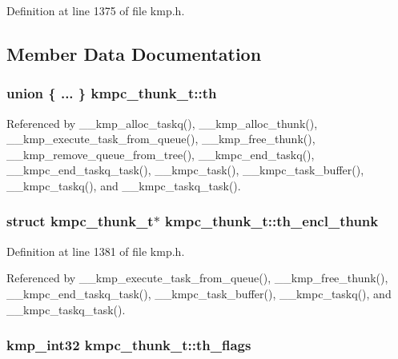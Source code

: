 Definition at line 1375 of file kmp.\-h.



\subsection{Member Data Documentation}
\hypertarget{structkmpc__thunk__t_a9e3c1d0245bed556c044849352192f7f}{
\subsubsection[{th}]{\setlength{\rightskip}{0pt plus 5cm}union \{ ... \}   kmpc\-\_\-thunk\-\_\-t\-::th}}\label{structkmpc__thunk__t_a9e3c1d0245bed556c044849352192f7f}


Referenced by \-\_\-\-\_\-kmp\-\_\-alloc\-\_\-taskq(), \-\_\-\-\_\-kmp\-\_\-alloc\-\_\-thunk(), \-\_\-\-\_\-kmp\-\_\-execute\-\_\-task\-\_\-from\-\_\-queue(), \-\_\-\-\_\-kmp\-\_\-free\-\_\-thunk(), \-\_\-\-\_\-kmp\-\_\-remove\-\_\-queue\-\_\-from\-\_\-tree(), \-\_\-\-\_\-kmpc\-\_\-end\-\_\-taskq(), \-\_\-\-\_\-kmpc\-\_\-end\-\_\-taskq\-\_\-task(), \-\_\-\-\_\-kmpc\-\_\-task(), \-\_\-\-\_\-kmpc\-\_\-task\-\_\-buffer(), \-\_\-\-\_\-kmpc\-\_\-taskq(), and \-\_\-\-\_\-kmpc\-\_\-taskq\-\_\-task().

\hypertarget{structkmpc__thunk__t_a1aeaa8d80dfb3e836624ae5ad492036d}{
\subsubsection[{th\-\_\-encl\-\_\-thunk}]{\setlength{\rightskip}{0pt plus 5cm}struct {\bf kmpc\-\_\-thunk\-\_\-t}$\ast$ kmpc\-\_\-thunk\-\_\-t\-::th\-\_\-encl\-\_\-thunk}}\label{structkmpc__thunk__t_a1aeaa8d80dfb3e836624ae5ad492036d}


Definition at line 1381 of file kmp.\-h.



Referenced by \-\_\-\-\_\-kmp\-\_\-execute\-\_\-task\-\_\-from\-\_\-queue(), \-\_\-\-\_\-kmp\-\_\-free\-\_\-thunk(), \-\_\-\-\_\-kmpc\-\_\-end\-\_\-taskq\-\_\-task(), \-\_\-\-\_\-kmpc\-\_\-task\-\_\-buffer(), \-\_\-\-\_\-kmpc\-\_\-taskq(), and \-\_\-\-\_\-kmpc\-\_\-taskq\-\_\-task().

\hypertarget{structkmpc__thunk__t_a9a36ce89c9dde209b70735a253164a98}{
\subsubsection[{th\-\_\-flags}]{\setlength{\rightskip}{0pt plus 5cm}kmp\-\_\-int32 kmpc\-\_\-thunk\-\_\-t\-::th\-\_\-flags}}\label{structkmpc__thunk__t_a9a36ce89c9dde209b70735a253164a98}


